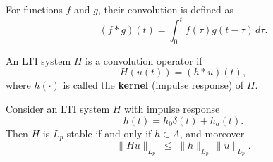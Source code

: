 \begin{definition}[Convolution]  
For functions $f$ and $g$, their convolution is defined as
\[
(f * g)(t) = \int_0^t f(\tau) g(t-\tau)\, d\tau.
\]
\end{definition}

\begin{definition}  
An LTI system $H$ is a convolution operator if
\[
H(u(t)) = (h * u)(t),
\]
where $h(\cdot)$ is called the \textbf{kernel} (impulse response) of $H$.  
\end{definition}

\begin{theorem}[Lp Stability]  
Consider an LTI system $H$ with impulse response
\[
h(t) = h_0 \delta(t) + h_a(t).
\]  
Then $H$ is $L_p$ stable if and only if $h \in A$, and moreover
\[
\|Hu\|_{L_p} \;\leq\; \|h\|_{L_p}\, \|u\|_{L_p}.
\]
\end{theorem}